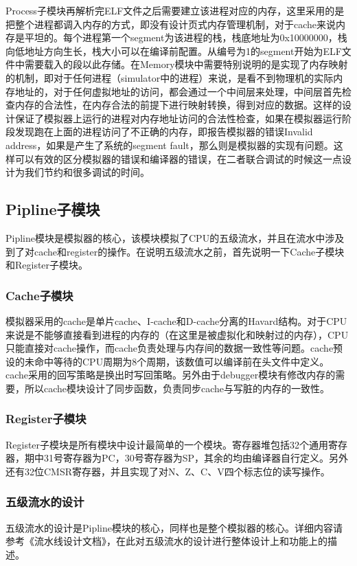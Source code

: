 \documentclass[12pt,a4paper]{article}
\begin{document}
Process子模块再解析完ELF文件之后需要建立该进程对应的内存，这里采用的是把整个进程都调入内存的方式，即没有设计页式内存管理机制，对于cache来说内存是平坦的。每个进程第一个segment为该进程的栈，栈底地址为0x10000000，栈向低地址方向生长，栈大小可以在编译前配置。从编号为1的segment开始为ELF文件中需要载入的段以此存储。在Memory模块中需要特别说明的是实现了内存映射的机制，即对于任何进程（simulator中的进程）来说，是看不到物理机的实际内存地址的，对于任何虚拟地址的访问，都会通过一个中间层来处理，中间层首先检查内存的合法性，在内存合法的前提下进行映射转换，得到对应的数据。这样的设计保证了模拟器上运行的进程对内存地址访问的合法性检查，如果在模拟器运行阶段发现跑在上面的进程访问了不正确的内存，即报告模拟器的错误Invalid address，如果是产生了系统的segment fault，那么则是模拟器的实现有问题。这样可以有效的区分模拟器的错误和编译器的错误，在二者联合调试的时候这一点设计为我们节约和很多调试的时间。

\subsection{Pipline子模块}
Pipline模块是模拟器的核心，该模块模拟了CPU的五级流水，并且在流水中涉及到了对cache和register的操作。在说明五级流水之前，首先说明一下Cache子模块和Register子模块。

\subsubsection{Cache子模块}
模拟器采用的cache是单片cache、I-cache和D-cache分离的Havard结构。对于CPU来说是不能够直接看到进程的内存的（在这里是被虚拟化和映射过的内存），CPU只能直接对cache操作，而cache负责处理与内存间的数据一致性等问题。cache预设的未命中等待的CPU周期为8个周期，该数值可以编译前在头文件中定义。cache采用的回写策略是换出时写回策略。另外由于debugger模块有修改内存的需要，所以cache模块设计了同步函数，负责同步cache与写脏的内存的一致性。

\subsubsection{Register子模块}
Register子模块是所有模块中设计最简单的一个模块。寄存器堆包括32个通用寄存器，期中31号寄存器为PC，30号寄存器为SP，其余的均由编译器自行定义。另外还有32位CMSR寄存器，并且实现了对N、Z、C、V四个标志位的读写操作。

\subsubsection{五级流水的设计}
五级流水的设计是Pipline模块的核心，同样也是整个模拟器的核心。详细内容请参考《流水线设计文档》，在此对五级流水的设计进行整体设计上和功能上的描述。
\end{document}
